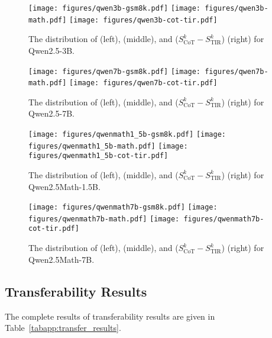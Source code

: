 \begin{figure*}
    \centering
    \texttt{[image: figures/qwen3b-gsm8k.pdf]}
    \texttt{[image: figures/qwen3b-math.pdf]}
    \texttt{[image: figures/qwen3b-cot-tir.pdf]}
    \caption{The distribution of {\scote} (left), {\stire} (middle), and ($S_{\text{CoT}}^k - S_{\text{TIR}}^k$) (right) for Qwen2.5-3B.}
    \label{fig:qwen3-scores}
\end{figure*}

\begin{figure*}
    \centering
    \texttt{[image: figures/qwen7b-gsm8k.pdf]}
    \texttt{[image: figures/qwen7b-math.pdf]}
    \texttt{[image: figures/qwen7b-cot-tir.pdf]}
    \caption{The distribution of {\scote} (left), {\stire} (middle), and ($S_{\text{CoT}}^k - S_{\text{TIR}}^k$) (right) for Qwen2.5-7B.}
    \label{fig:qwen7-scores}
\end{figure*}

\begin{figure*}
    \centering
    \texttt{[image: figures/qwenmath1\_5b-gsm8k.pdf]}
    \texttt{[image: figures/qwenmath1\_5b-math.pdf]}
    \texttt{[image: figures/qwenmath1\_5b-cot-tir.pdf]}
    \caption{The distribution of {\scote} (left), {\stire} (middle), and ($S_{\text{CoT}}^k - S_{\text{TIR}}^k$) (right) for Qwen2.5Math-1.5B.}
    \label{fig:qwenmath15-scores}
\end{figure*}

\begin{figure*}
    \centering
    \texttt{[image: figures/qwenmath7b-gsm8k.pdf]}
    \texttt{[image: figures/qwenmath7b-math.pdf]}
    \texttt{[image: figures/qwenmath7b-cot-tir.pdf]}
    \caption{The distribution of {\scote} (left), {\stire} (middle), and ($S_{\text{CoT}}^k - S_{\text{TIR}}^k$) (right) for Qwen2.5Math-7B.}
    \label{fig:qwenmath7-scores}
\end{figure*}




\subsection{Transferability Results}\label{app:transfer}

The complete results of transferability results are given in Table~\ref{tabapp:transfer_results}.

